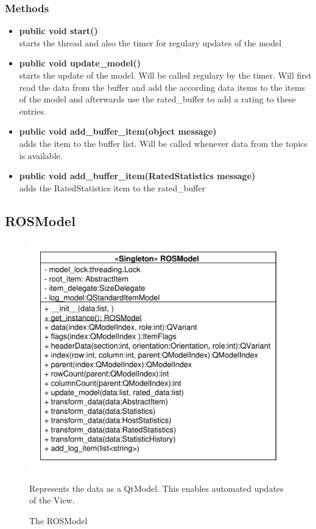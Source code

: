 \subsubsection{Methods}
\begin{itemize}
  \item \textbf{public void start()}\\
  starts the thread and also the timer for regulary updates of the model
  \item \textbf{public void update\_model()}\\ 
  starts the update of the model. Will be called regulary by the timer. Will first read the data from the buffer and add the according data items to the items of the model and afterwards use the rated\_buffer to add a rating to these entries.
  \item \textbf{public void add\_buffer\_item(object message)}\\ 
  adds the item to the buffer list. Will be called whenever data from the topics
  is available.
  \item \textbf{public void add\_buffer\_item(RatedStatistics message)}\\
  adds the RatedStatistics item to the rated\_buffer
\end{itemize}

\subsection{ROSModel}
\begin{figure}[htbp]
	\begin{minipage}[t]{7cm}
		\vspace{0pt}
		\centering
		\includegraphics[scale=0.6]{./diagram_pictures/ROSModel.pdf}
		\caption{The ROSModel}
	\end{minipage}
	\hfill
	\begin{minipage}[t]{6cm}
		\vspace{10pt}		
		Represents the data as a QtModel. This enables automated updates of the View.
	\end{minipage}
\end{figure}
